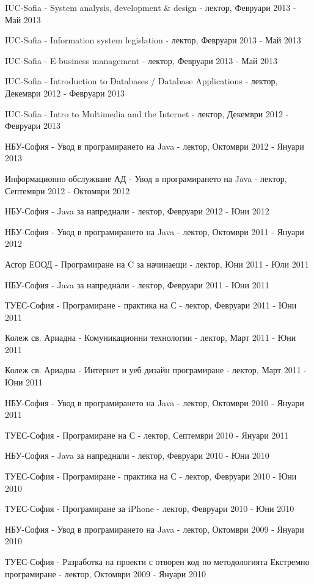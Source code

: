 \documentclass[bulgarian,a4paper]{europasscv}
\begin{document}
\begin{europasscv}
{\begin{ecvitemize}
    \item IUC-Sofia - System analysis, development \& design - лектор, Февруари 2013 - Май 2013
    \item IUC-Sofia - Information system legislation - лектор, Февруари 2013 - Май 2013
    \item IUC-Sofia - E-business management - лектор, Февруари 2013 - Май 2013
    \item IUC-Sofia - Introduction to Databases / Database Applications - лектор, Декември 2012 - Февруари 2013
    \item IUC-Sofia - Intro to Multimedia and the Internet - лектор, Декември 2012 - Февруари 2013
    \item НБУ-София - Увод в програмирането на Java - лектор, Октомври 2012 - Януари 2013
    \item Информационно обслужване АД - Увод в програмирането на Java - лектор, Септември 2012 - Октомври 2012
    \item НБУ-София - Java за напреднали - лектор, Февруари 2012 - Юни 2012
    \item НБУ-София - Увод в програмирането на Java - лектор, Октомври 2011 - Януари 2012
    \item Асгор ЕООД - Програмиране на C за начинаещи - лектор, Юни 2011 - Юли 2011
    \item НБУ-София - Java за напреднали - лектор, Февруари 2011 - Юни 2011
    \item ТУЕС-София - Програмиране - практика на С - лектор, Февруари 2011 - Юни 2011
    \item Колеж св. Ариадна - Комуникационни технологии - лектор, Март 2011 - Юни 2011
    \item Колеж св. Ариадна - Интернет и уеб дизайн програмиране - лектор, Март 2011 - Юни 2011
    \item НБУ-София - Увод в програмирането на Java - лектор, Октомври 2010 - Януари 2011
    \item ТУЕС-София - Програмиране на С - лектор, Септември 2010 - Януари 2011
    \item НБУ-София - Java за напреднали - лектор, Февруари 2010 - Юни 2010
    \item ТУЕС-София - Програмиране - практика на С - лектор, Февруари 2010 - Юни 2010
    \item ТУЕС-София - Програмиране за iPhone - лектор, Февруари 2010 - Юни 2010
    \item НБУ-София - Увод в програмирането на Java - лектор, Октомври 2009 - Януари 2010
    \item ТУЕС-София - Разработка на проекти с отворен код по методологията Екстремно програмиране - лектор, Октомври 2009 - Януари 2010

\end{ecvitemize}}
\end{europasscv}
\end{document}
